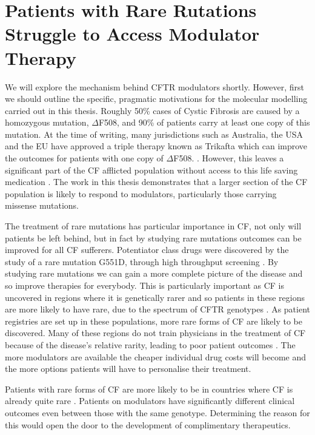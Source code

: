 \section{Patients with Rare Rutations Struggle to Access Modulator Therapy}
We will explore the mechanism behind CFTR modulators shortly. However, first we should outline the specific, pragmatic motivations for the molecular modelling carried out in this thesis. Roughly 50\% cases of Cystic Fibrosis are caused by a homozygous mutation, $\Delta$F508, and 90\% of patients carry at least one copy of this mutation. At the time of writing, many jurisdictions such as Australia, the USA and the EU have approved a triple therapy known as Trikafta which can improve the outcomes for patients with one copy of $\Delta$F508. . However, this leaves a significant part of the CF afflicted population without access to this life saving medication \cite{}. The work in this thesis demonstrates that a larger section of the CF population is likely to respond to modulators, particularly those carrying missense mutations.

The treatment of rare mutations has particular importance in CF, not only will patients be left behind, but in fact by studying rare mutations outcomes can be improved for all CF sufferers. Potentiator class drugs were discovered by the study of a rare mutation G551D, through high throughput screening \cite{vangoor2009}. By studying rare mutations we can gain a more complete picture of the disease and so improve therapies for everybody. This is particularly important as CF is uncovered in regions where it is genetically rarer and so patients in these regions are more likely to have rare, due to the spectrum of CFTR genotypes \cite{singh2015,zheng2017,ni2022}. As patient registries are set up in these populations, more rare forms of CF are likely to be discovered. Many of these regions do not train physicians in the treatment of CF because of the disease's relative rarity, leading to poor patient outcomes \cite{}. The more modulators are available the cheaper individual drug costs will become and the more options patients will have to personalise their treatment.

Patients with rare forms of CF are more likely to be in countries where CF is already quite rare \cite{zheng2017}. Patients on modulators have significantly different clinical outcomes even between those with the same genotype. Determining the reason for this would open the door to the development of complimentary therapeutics. 

